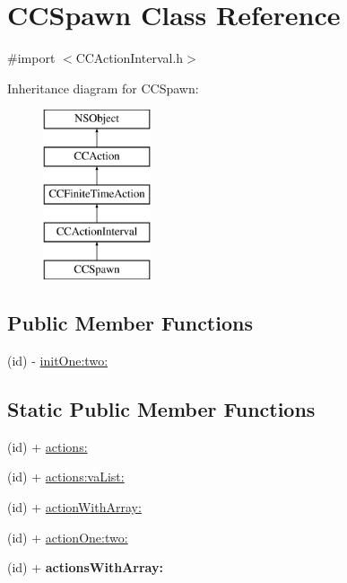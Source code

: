 \hypertarget{interface_c_c_spawn}{\section{C\-C\-Spawn Class Reference}
\label{interface_c_c_spawn}
}


{\ttfamily \#import $<$C\-C\-Action\-Interval.\-h$>$}

Inheritance diagram for C\-C\-Spawn\-:\begin{figure}[H]
\begin{center}
\leavevmode
\includegraphics[height=5.000000cm]{interface_c_c_spawn}
\end{center}
\end{figure}
\subsection*{Public Member Functions}
\begin{DoxyCompactItemize}
\item 
(id) -\/ \hyperlink{interface_c_c_spawn_aeb68fd5ff22e8c9511720d8cb4b8e2a1}{init\-One\-:two\-:}
\end{DoxyCompactItemize}
\subsection*{Static Public Member Functions}
\begin{DoxyCompactItemize}
\item 
(id) + \hyperlink{interface_c_c_spawn_a2b303ec44551f3a6086a61b3b10f004f}{actions\-:}
\item 
(id) + \hyperlink{interface_c_c_spawn_a1b6bbb2f5ff5edc7b450b883e6232b8e}{actions\-:va\-List\-:}
\item 
(id) + \hyperlink{interface_c_c_spawn_a0babd8e677501419c8f7c96afea3b030}{action\-With\-Array\-:}
\item 
(id) + \hyperlink{interface_c_c_spawn_ae11052bb5286f2642ae9fdec64d11e1f}{action\-One\-:two\-:}
\item 
\hypertarget{interface_c_c_spawn_addd450b89e3a68eae312d65ecbb99483}{(id) + {\bfseries actions\-With\-Array\-:}}\label{interface_c_c_spawn_addd450b89e3a68eae312d65ecbb99483}

\end{DoxyCompactItemize}
